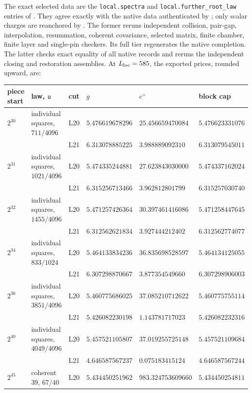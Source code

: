 \begin{certificate}
The exact selected data are the \texttt{local.spectra} and
\texttt{local.further\_root\_law} entries of
. They agree
exactly with the native data authenticated by
; only scalar charges
are reanchored by .
The former reruns independent collision, pair-gap, interpolation,
resummation, coherent covariance, selected matrix, finite chamber,
finite layer and single-pin checkers. Its full tier regenerates the
native completion. The latter checks exact equality of all native
records and reruns the independent closing and restoration assemblies.
At $L_{\rm loc}=585$, the exported prices, rounded upward, are:
\begin{center}\scriptsize
\begin{tabular}{@{}llllll@{}}
\toprule
piece start & law, $\mathsf u$ & cut & $g$ & $c^+$ & block cap\\
\midrule
$2^{30}$ & individual squares, $711/4096$ & L20 & $5.476619678296$ & $25.456659470084$ & $5.476623331076$\\
 &  & L21 & $6.313078885225$ & $3.988889092310$ & $6.313079545011$\\
$2^{31}$ & individual squares, $1021/4096$ & L20 & $5.474335244881$ & $27.623843030000$ & $5.474337162024$\\
 &  & L21 & $6.315256713466$ & $3.962812801799$ & $6.315257030740$\\
$2^{32}$ & individual squares, $1455/4096$ & L20 & $5.471257426364$ & $30.397461416086$ & $5.471258447645$\\
 &  & L21 & $6.312562621834$ & $3.927444212402$ & $6.312562774077$\\
$2^{34}$ & individual squares, $833/1024$ & L20 & $5.464133834236$ & $36.835698528597$ & $5.464134125055$\\
 &  & L21 & $6.307298870667$ & $3.877354549660$ & $6.307298906003$\\
$2^{36}$ & individual squares, $3851/4096$ & L20 & $5.460775686025$ & $37.085210712622$ & $5.460775755114$\\
 &  & L21 & $5.426082230198$ & $1.143781717023$ & $5.426082232316$\\
$2^{40}$ & individual squares, $4049/4096$ & L20 & $5.457521105807$ & $37.019255725148$ & $5.457521109684$\\
 &  & L21 & $4.646587567237$ & $0.075183415124$ & $4.646587567244$\\
$2^{45}$ & coherent 39, $67/40$ & L20 & $5.434450251962$ & $983.324753609660$ & $5.434450254811$\\

\end{tabular}
\end{center}
\end{certificate}
